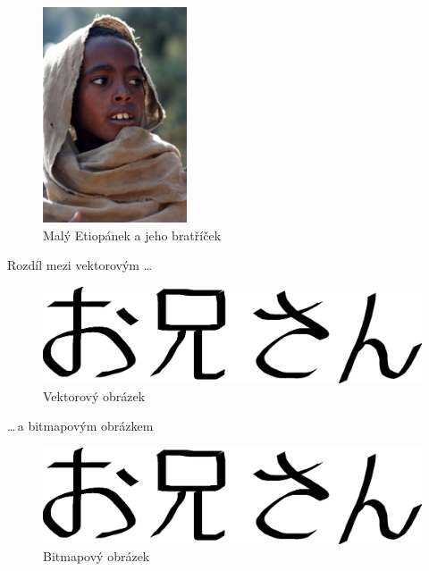 \documentclass[a4paper, 11pt]{article}
\begin{document}
\begin{figure}[h]
    \centering
    \includegraphics[width=4.25cm]{include/etiopan.eps}\hspace{0.2mm}
    \caption{Malý Etiopánek a jeho bratříček}
    \label{fig:obr1}
\end{figure}

\newpage

Rozdíl mezi vektorovým \dots
\begin{figure}[h]
    \centering
    \includegraphics[scale=0.4]{include/oniisan.eps}
    \caption{Vektorový obrázek}
    \label{fig:obr2}
\end{figure}
\bigskip

\noindent\dots\,a bitmapovým obrázkem
\begin{figure}[h]
    \centering
    \medskip
    \includegraphics[scale=0.4]{include/oniisan.eps}
    \bigskip
    \caption{Bitmapový obrázek}
    \label{fig:obr3}
\end{figure}
\bigskip
\end{document}

